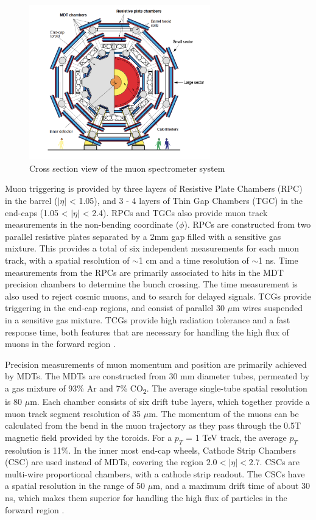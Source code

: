 \begin{figure}
        \centering
	\includegraphics[width=0.7\textwidth]{figures/ch4/muonSpec.png}
	\caption{Cross section view of the muon spectrometer system \cite{muon_tdr} }
	\label{fig:muonSpec}
\end{figure}

Muon triggering is provided by three layers of Resistive Plate Chambers (RPC) in the barrel ($|\eta|$ < 1.05), and 3 - 4 layers of Thin Gap Chambers (TGC) in the end-caps (1.05 < $|\eta|$ < 2.4). RPCs and TGCs also provide muon track measurements in the non-bending coordinate ($\phi$). RPCs are constructed from two parallel resistive plates separated by a 2mm gap filled with a sensitive gas mixture. This provides a total of six independent measurements for each muon track, with a spatial resolution of $\sim$1 cm and a time resolution of $\sim$1 ns. Time measurements from the RPCs are primarily associated to hits in the MDT precision chambers to determine the bunch crossing. The time measurement is also used to reject cosmic muons, and to search for delayed signals. TCGs provide triggering in the end-cap regions, and consist of parallel 30 $\mu$m wires suspended in a sensitive gas mixture. TCGs provide high radiation tolerance and a fast response time, both features that are necessary for handling the high flux of muons in the forward region \cite{muon_tdr}.\par

Precision measurements of muon momentum and position are primarily achieved by MDTs. The MDTs are constructed from 30 mm diameter tubes, permeated by a gas mixture of 93\% Ar and 7\% CO\textsubscript{2}. The average single-tube spatial resolution is 80 $\mu$m. Each chamber consists of six drift tube layers, which together provide a muon track segment resolution of 35 $\mu$m. The momentum of the muons can be calculated from the bend in the muon trajectory as they pass through the 0.5T magnetic field provided by the toroids. For a $p_T$ = 1 TeV track, the average $p_T$ resolution is 11\%. In the inner most end-cap wheels, Cathode Strip Chambers (CSC) are used instead of MDTs, covering the region $2.0 < |\eta| < 2.7$. CSCs are multi-wire proportional chambers, with a cathode strip readout. The CSCs have a spatial resolution in the range of 50 $\mu$m, and a maximum drift time of about 30 ns, which makes them superior for handling the high flux of particles in the forward region \cite{muon_spec}. 

